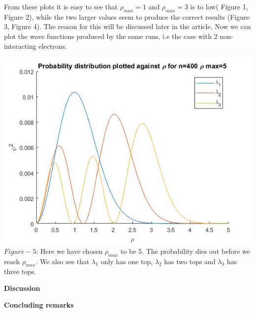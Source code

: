 \documentclass[10pt,a4paper]{article}
\begin{document}
\noindent From these plots it is easy to see that ${\rho}_{max}=1$ and ${\rho}_{max}=3$ is to low( Figure 1, Figure 2), while the two larger values seem to produce the correct results (Figure 3, Figure 4). The reason for this will be discussed later in the article. Now we can plot the wave functions produced by the same runs, i.e the case with 2 non-interacting electrons. 
\newpage
\begin{center}
\includegraphics[scale=0.5]{eig400rho5.jpg}
$Figure-5$: Here we have chosen ${\rho}_{max}$ to be 5. The probability dies out before we reach ${\rho}_{max}$. We also see that $\lambda_1$ only has one top, $\lambda_2$ has two tops and $\lambda_3$ has three tops. 




\end{center}





\newpage

\begin{center}
{\LARGE\bf Discussion}
\end{center}
\newpage

\begin{center}
{\LARGE\bf Concluding remarks}
\end{center}
\end{document}
